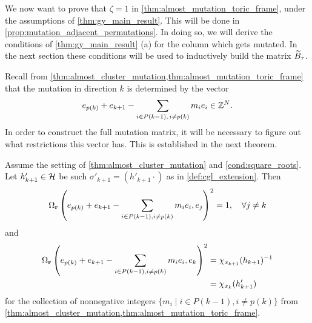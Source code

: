 We now want to prove that $\zeta = 1$ in \cref{thm:almost_mutation_toric_frame}, under
the assumptions of \cref{thm:gy_main_result}. This will be done in
\cref{prop:mutation_adjacent_permutations}. In doing so, we will derive the conditions
of \cref{thm:gy_main_result} (a) for the column which gets mutated. In the next section
these conditions will be used to inductively build the matrix $\widetilde{B}_\tau$.

\medskip

Recall from \cref{thm:almost_cluster_mutation,thm:almost_mutation_toric_frame} that the
mutation in direction $k$ is determined by the vector
\begin{equation*}
	e_{p(k)} + e_{k+1} - \sum_{i \in P(k-1),\,i\neq p(k)} m_i e_i \in \mathbb{Z}^N.
\end{equation*}
%
In order to construct the full mutation matrix, it will be necessary to figure out what
restrictions this vector has. This is established in the next theorem.
\begin{theorem}

	Assume the setting of \cref{thm:almost_cluster_mutation} and \cref{cond:square_roots}.
	Let $h'_{k+1} \in \mathcal{H}$ be such $\sigma'_{k+1} = (h'_{k+1}\cdot)$ as in
	\cref{def:cgl_extension}. Then
	\begin{equation}  \label{eq:Omega_r_squared_one}
		\Omega_{\mathbf{r}}\left(e_{p(k)} + e_{k+1} - \sum_{i \in P(k-1), i\neq p(k)} m_i e_i, e_j\right)^2  = 1, \quad \forall j \neq k
	\end{equation}
	and
	\begin{equation}\label{eq:Omega_r_squared_ek}
		\begin{aligned}
			\Omega_{\mathbf{r}}\left(e_{p(k)} + e_{k+1} - \sum_{i \in P(k-1), i\neq p(k)}m_i e_i, e_k\right)^2 & = \chi_{x_{k+1}}(h_{k+1})^{-1} \\
			                                                                                             & = \chi_{x_k}(h'_{k+1})
		\end{aligned}
	\end{equation}
	for the collection of nonnegative integers $\{m_i \mid i \in P(k-1), i\neq p(k)\}$ from
	\cref{thm:almost_cluster_mutation,thm:almost_mutation_toric_frame}.

\end{theorem}

